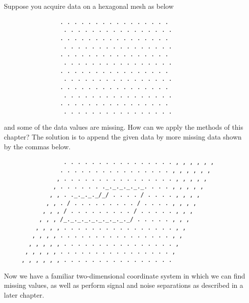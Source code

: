 \par
Suppose you acquire data on a hexagonal mesh as below
\par\noindent
\begin{verbatim}
                . . . . . . . . . . . . . . . .
                 . . . . . . . . . . . . . . . .
                . . . . . . . . . . . . . . . .
                 . . . . . . . . . . . . . . . .
                . . . . . . . . . . . . . . . .
                 . . . . . . . . . . . . . . . .
                . . . . . . . . . . . . . . . .
                 . . . . . . . . . . . . . . . .
                . . . . . . . . . . . . . . . .
                 . . . . . . . . . . . . . . . .
                . . . . . . . . . . . . . . . .
                 . . . . . . . . . . . . . . . .
\end{verbatim}
\par\noindent
and some of the data values are missing.
How can we apply the methods of this chapter?
The solution is to append the given data by more missing data
shown by the commas below.
\par\noindent
\begin{verbatim}
                 . . . . . . . . . . . . . . . . , , , , , ,
                . . . . . . . . . . . . . . . . , , , , , ,
               , . . . . . . . . . . . . . . . . , , , , ,
              , . . . . . . ._._._._._._. . . . , , , , ,
             , , . ._._._._/_/ . . . . / . . . . , , , ,
            , , . / . . . . . . . . . / . . . . , , , ,
           , , , / . . . . . . . . . / . . . . . , , ,
          , , , /_._._._._._._._._._/ . . . . . , , ,
         , , , , . . . . . . . . . . . . . . . . , ,
        , , , , . . . . . . . . . . . . . . . . , ,
       , , , , , . . . . . . . . . . . . . . . . ,
      , , , , , . . . . . . . . . . . . . . . . ,
     , , , , , , . . . . . . . . . . . . . . . . 
\end{verbatim}
\par\noindent
Now we have a familiar two-dimensional coordinate system
in which we can find missing values,
as well as perform signal and noise separations
as described in a later chapter.



